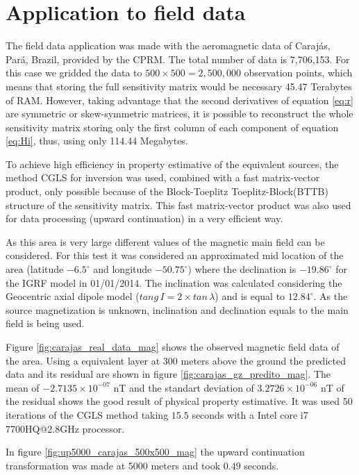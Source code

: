 \section{Application to field data}

The field data application was made with the aeromagnetic data of Carajás, Pará, Brazil, provided by the CPRM. 
The total number of data is 7,706,153. For this case we gridded the data to $500 \times 500 = 2,500,000$ observation points, which means that storing the full sensitivity matrix would be necessary 45.47 Terabytes of RAM. However, taking advantage that the second derivatives of equation \ref{eq:r} are symmetric or skew-symmetric matrices, it is possible to reconstruct the whole sensitivity matrix storing only the first column of each component of equation \ref{eq:Hi}, thus, using only 114.44 Megabytes.

To achieve high efficiency in property estimative of the equivalent sources, the method CGLS for inversion was used, combined with a fast matrix-vector product, only possible because of the Block-Toeplitz Toeplitz-Block(BTTB) structure of the sensitivity matrix. This fast matrix-vector product was also used for data processing (upward continuation) in a very efficient way.

As this area is very large different values of the magnetic main field can be considered. 
For this test it was considered an approximated mid location of the area (latitude $-6.5^{\circ}$ and longitude $-50.75^{\circ}$) where the declination is $-19.86^{\circ}$ for the IGRF model in 01/01/2014. The inclination was calculated considering the Geocentric axial dipole model ($tang \, I = 2 \times tan \, \lambda$) and is equal to $12.84^{\circ}$.
As the source magnetization is unknown, inclination and declination equals to the main field is being used.

Figure \ref{fig:carajas_real_data_mag} shows the observed magnetic field data of the area. Using a equivalent layer at $300$ meters above the ground the predicted data and its residual are shown in figure \ref{fig:carajas_gz_predito_mag}. The mean of $-2.7135\times 10^{-07}$ nT and the standart deviation of $3.2726\times 10^{-06}$ nT of the residual shows the good result of physical property estimative. It was used 50 iterations of the CGLS method taking $15.5$ seconds with a Intel core i7 7700HQ@2.8GHz processor.

In figure \ref{fig:up5000_carajas_500x500_mag} the upward continuation transformation was made at $5000$ meters and took $0.49$ seconds.